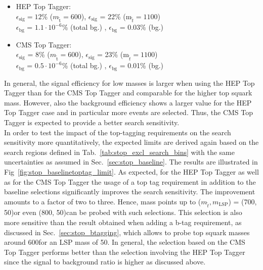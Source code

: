 \begin{itemize}
 \item HEP Top Tagger: \\
 $\epsilon_\mathrm{sig} = 12$\% ($m_\mathrm{\tilde{t}} = 600$\gev), $\epsilon_\mathrm{sig}$ = 22\% ($\mathrm{m}_{\tilde{t}} = 1100$\gev) \\
$\epsilon_\mathrm{bg}$ = $1.1 \cdot 10^{-6}$\;\% (total bg.) , $\epsilon_\mathrm{bg}$ = 0.03\% (\ttbar bg.)
 \item CMS Top Tagger: \\
$\epsilon_\mathrm{sig}$ = 8\% ($m_\mathrm{\tilde{t}} = 600$\gev), $\epsilon_\mathrm{sig}$ = 23\% ($\mathrm{m}_{\tilde{t}} = 1100$\gev) \\
$\epsilon_\mathrm{bg}$ = $0.5 \cdot 10^{-6}$\;\% (total bg.) , $\epsilon_\mathrm{bg}$ = 0.01\% (\ttbar bg.)
\end{itemize}
In general, the signal efficiency for low masses is larger when using the HEP Top Tagger than for the CMS Top Tagger and comparable for the higher top squark mass. However, also the background efficiency shows a larger value for the HEP Top Tagger case and in particular more \ttbar events are selected. Thus, the CMS Top Tagger is expected to provide a better search sensitivity. \\
In order to test the impact of the top-tagging requirements on the search sensitivity more quantitatively, the expected limits are derived again based on the search regions defined in Tab.~\ref{tab:stop_excl_search_bins} with the same uncertainties as assumed in Sec.~\ref{sec:stop_baseline}. The results are illustrated in Fig~\ref{fig:stop_baselinetoptag_limit}. As expected, for the HEP Top Tagger as well as for the CMS Top Tagger the usage of a top tag requirement in addition to the baseline selections significantly improves the search sensitivity. The improvement amounts to a factor of two to three. Hence, mass points up to ($m_{\tilde{t}}, m_\mathrm{LSP}$) = (700, 50)\gev or even (800, 50)\gev can be probed with such selections. This selection is also more sensitive than the result obtained when adding a b-tag requirement, as discussed in Sec.~\ref{sec:stop_btagging}, which allows to probe top squark masses around 600\gev for an LSP mass of 50\gev. In general, the selection based on the CMS Top Tagger performs better than the selection involving the HEP Top Tagger since the signal to background ratio is higher as discussed above. 
